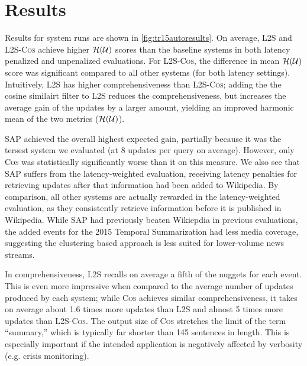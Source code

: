 \section{Results} \label{sec:results}

Results for system runs are shown in \autoref{fig:tr15autoresults}.  On
average, \textsc{L2S} and \textsc{L2S-Cos} achieve higher
$\mathcal{H}(\mathcal{U})$ scores than the baseline systems in both latency
penalized and unpenalized evaluations. For \textsc{L2S-Cos}, the difference in
mean $\mathcal{H}(\mathcal{U})$ score was significant compared to all other
systems (for both latency settings). Intuitively, L2S has higher comprehensiveness than \textsc{L2S-Cos}; adding the the cosine similairt filter to L2S 
reduces the comprehensiveness, but increases the average gain of the 
updates by a larger amount, yielding an improved harmonic mean of the two
metrics ($\mathcal{H}(\mathcal{U})$).
 
\textsc{SAP} achieved the overall highest expected gain, partially because it
was the tersest system we evaluated (at 8 updates per query on average).
However, only \textsc{Cos} was statistically significantly worse than it on
this measure. We also see that SAP suffers from the latency-weighted evaluation, receiving latency penalties for retrieving updates after that information
had been added to Wikipedia. By comparison, all other systems are actually 
rewarded in the latency-weighted evaluation, as they consistently
retrieve information before it is published in Wikipedia. While SAP
had previously beaten Wikiepdia in previous evaluations, the added events
for the 2015 Temporal Summarization had less media coverage, suggesting
the clustering based approach is less suited for lower-volume news streams.


 
In comprehensiveness, \textsc{L2S} recalls on average a fifth of the nuggets
for each event. This is even more impressive when  compared to the average
number of updates produced by each system; while \textsc{Cos} achieves similar
comprehensiveness, it takes on average about 1.6 times more updates than
\textsc{L2S} and almost 5 times more updates than \textsc{L2S-Cos}. The output
size of \textsc{Cos} stretches the limit of the term ``summary,'' which is
typically far shorter than 145 sentences in length.  This is especially
important if the intended application is negatively affected by verbosity
(e.g. crisis monitoring).





